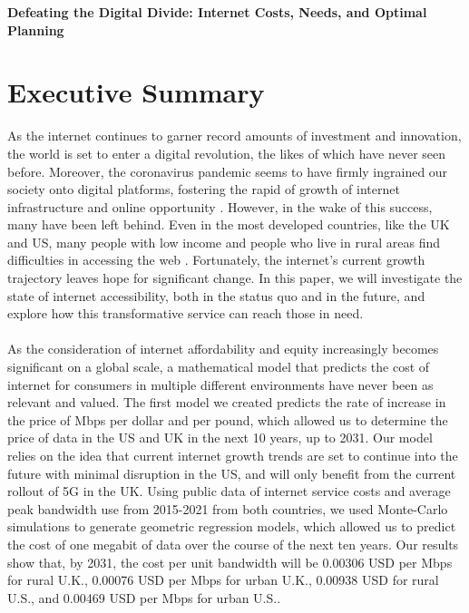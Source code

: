 \documentclass[12pt]{article}
\begin{document}
\begin{center}
    \LARGE \textbf{Defeating the Digital Divide: Internet Costs, Needs, and Optimal Planning}
\end{center}

\section{Executive Summary}

As the internet continues to garner record amounts of investment and innovation, the world is set to enter a digital revolution, the likes of which have never seen before. Moreover, the coronavirus pandemic seems to have firmly ingrained our society onto digital platforms, fostering the rapid of growth of internet infrastructure and online opportunity \cite{bbcCOVID}. However, in the wake of this success, many have been left behind. Even in the most developed countries, like the UK and US, many people with low income and people who live in rural areas find difficulties in accessing the web \cite{publicintegrity}. Fortunately, the internet's current growth trajectory leaves hope for significant change. In this paper, we will investigate the state of internet accessibility, both in the status quo and in the future, and explore how this transformative service can reach those in need.
\\
\\
As the consideration of internet affordability and equity increasingly becomes significant on a global scale, a mathematical model that predicts the cost of internet for consumers in multiple different environments have never been as relevant and valued. The first model we created predicts the rate of increase in the price of Mbps per dollar and per pound, which allowed us to determine the price of data in the US and UK in the next 10 years, up to 2031. Our model relies on the idea that current internet growth trends are set to continue into the future with minimal disruption in the US, and will only benefit from the current rollout of 5G in the UK. Using public data of internet service costs and average peak bandwidth use from 2015-2021 from both countries, we used Monte-Carlo simulations to generate geometric regression models, which allowed us to predict the cost of one megabit of data over the course of the next ten years. Our results show that, by 2031, the cost per unit bandwidth will be 0.00306 USD per Mbps for rural U.K., 0.00076 USD per Mbps for urban U.K., 0.00938 USD for rural U.S., and 0.00469 USD per Mbps for urban U.S..
\end{document}
